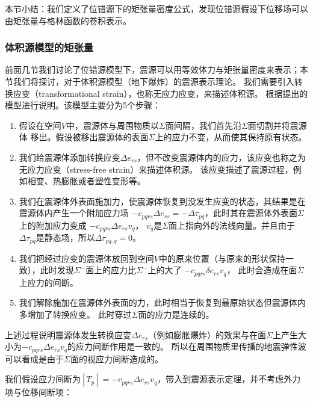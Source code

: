 本节小结：我们定义了位错源下的矩张量密度公式，发现位错源假设下位移场可以由矩张量与格林函数的卷积表示。



\subsubsection{体积源模型的矩张量}
前面几节我们讨论了位错源模型下，震源可以用等效体力与矩张量密度来表示；本节我们将探讨，对于体积源模型（地下爆炸）的震源表示理论。
我们需要引入转换应变（transformational strain），也称无应力应变，来描述体积源。
根据\citep{eshelby1957determination}提出的模型进行说明。该模型主要分为5个步骤：

\begin{enumerate}
\item 假设在空间$V$中，震源体与周围物质以$\Sigma$面间隔，我们首先沿$\Sigma$面切割并将震源体 
移出。假设被移出震源体的表面$\Sigma$上的应力不变，从而使其保持原有状态。
\item 我们给震源体添加转换应变$\Delta e_{rs}$，但不改变震源体内的应力，该应变也称之为无应力应变（stress-free strain）来描述体积源。
该应变描述了震源过程，例如相变、热膨胀或者塑性变形等。
\item 我们在震源体外表面施加力，使震源体恢复到没发生应变的状态，其结果是在震源体内产生一个附加应力场
$-c_{pqrs} \Delta e_{rs} = -\Delta \tau_{pq}$，此时其在震源体外表面$\Sigma$上的附加应力变成 $-c_{pqrs} \Delta e_{rs} v_q$，
$v_q$是$\Sigma$面上指向外的法线向量。并且由于$\Delta \tau_{pq}$是静态场，所以$\Delta \tau_{pq,q}=0$。
\item 我们把经过应变的震源体放回到空间$V$中的原来位置（与原来的形状保持一致），此时发现$\Sigma^-$面上的应力比$\Sigma^-$上的大了 $-c_{pqrs} \delta e_{rs} v_q$，
此时会造成在面$\Sigma$上应力的间断。
\item 我们解除施加在震源体外表面的力，此时相当于恢复到最原始状态但震源体内多增加了转换应变。
此时穿过$\Sigma$面的应力是连续的。
\end{enumerate}
上述过程说明震源体发生转换应变$\Delta e_{rs}$（例如膨胀爆炸）的效果与在面$\Sigma$上产生大小为$-c_{pqrs} \Delta e_{rs} v_q$的应力间断作用是一致的。
所以在周围物质里传播的地震弹性波可以看成是由于$\Sigma$面的视应力间断造成的。

我们假设应力间断为$[T_p]=-c_{pqrs} \Delta e_{rs} v_q$，带入到震源表示定理，并不考虑外力项与位移间断项：

